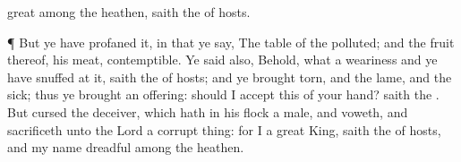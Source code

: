 {great among the
heathen,
saith the
{} of
hosts.
\par }{\PP {}¶ But ye have
profaned it, in that ye
say, The
table of the
{}
{}
polluted; and the
fruit thereof,
{} his
meat,
{}
contemptible.
Ye
said also, Behold, what a
weariness
{} and ye have
snuffed at it,
saith the
{} of
hosts; and ye
brought
{}
torn, and the
lame, and the
sick; thus ye
brought an
offering: should I
accept this of your
hand?
saith the
{}.
But
cursed
{} the
deceiver,
which hath in his
flock a
male, and
voweth, and
sacrificeth unto the
Lord a corrupt
thing: for I
{} a
great
King,
saith the
{} of
hosts, and my
name
{}
dreadful among the
heathen.

}
